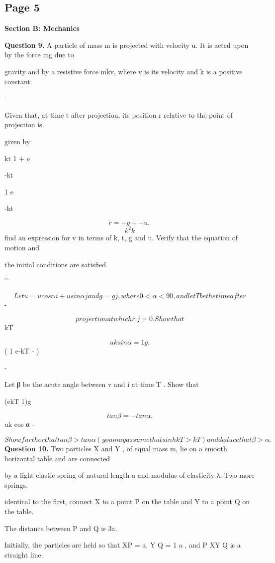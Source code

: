 \documentclass[12pt]{article}
\begin{document}
\subsection*{Page 5}
\begin{flushleft}
\bigskip\textbf{Section B: Mechanics}\par
\bigskip\textbf{Question 9.} A particle of mass m is projected with velocity u. It is acted upon by the force mg due to\par
gravity and by a resistive force mkv, where v is its velocity and k is a positive constant.\par
-\par
Given that, at time t after projection, its position r relative to the point of projection is\par
given by\par
kt 1 + e\par
-kt\par
1 e\par
-kt\par
\[r = - g + - u ,\]
\[k^2 k\]
find an expression for v in terms of k, t, g and u. Verify that the equation of motion and\par
the initial conditions are satisfied.\par
\textasciicircum{}\circ\par
\[Let u = u cos α i + u sin α j and g = g j, where 0 < α < 90 , and let T be the time after\]
-\par
\[projection at which r . j = 0. Show that\]
kT\par
\[uk sin α = 1 g .\]
( 1 e-kT - )\par
-\par
Let β be the acute angle between v and i at time T . Show that\par
(ekT 1)g\par
\[tan β = - tan α .\]
uk cos α -\par
\[Show further that tan β > tan α (you may assume that sinh kT > kT ) and deduce that β > α.\]
\bigskip\textbf{Question 10.} Two particles X and Y , of equal mass m, lie on a smooth horizontal table and are connected\par
by a light elastic spring of natural length a and modulus of elasticity λ. Two more springs,\par
identical to the first, connect X to a point P on the table and Y to a point Q on the table.\par
The distance between P and Q is 3a.\par
Initially, the particles are held so that XP = a, Y Q = 1 a , and P XY Q is a straight line.\par

\end{flushleft}
\end{document}
